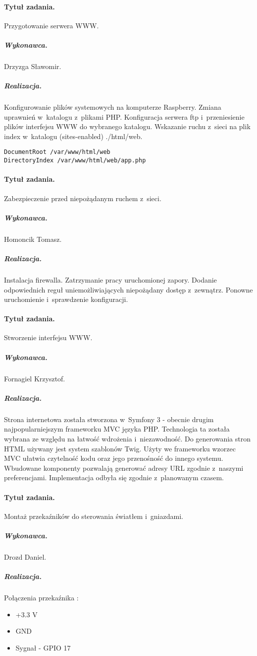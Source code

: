 \paragraph{Tytuł zadania.} Przygotowanie serwera WWW.
\subparagraph{Wykonawca.} Drzyzga Sławomir.
\subparagraph{Realizacja.} 
Konfigurowanie plików systemowych na komputerze Raspberry. Zmiana uprawnień w~katalogu z~plikami PHP. Konfiguracja serwera ftp i~przeniesienie plików interfejsu WWW do wybranego katalogu. Wskazanie ruchu z~sieci na plik index w~katalogu (sites-enabled) ./html/web.
\begin{verbatim}
DocumentRoot /var/www/html/web
DirectoryIndex /var/www/html/web/app.php
\end{verbatim}

	
	\paragraph{Tytuł zadania.} Zabezpieczenie przed niepożądanym ruchem z~sieci.
	\subparagraph{Wykonawca.} Homoncik Tomasz.
	\subparagraph{Realizacja.} Instalacja firewalla. Zatrzymanie pracy uruchomionej zapory. Dodanie odpowiednich reguł uniemożliwiających niepożądany dostęp z~zewnątrz. Ponowne uruchomienie i~sprawdzenie konfiguracji.
	
	\paragraph{Tytuł zadania.} Stworzenie interfejsu WWW.
	\subparagraph{Wykonawca.} Fornagiel Krzysztof.
	\subparagraph{Realizacja.} 
	Strona internetowa została stworzona w~Symfony 3 - obecnie drugim najpopularniejszym frameworku MVC języka PHP. Technologia ta została wybrana ze względu na łatwość wdrożenia i~niezawodność. Do generowania stron HTML używany jest system szablonów Twig. Użyty we frameworku wzorzec MVC ułatwia czytelność kodu oraz jego przenośność do innego systemu. Wbudowane komponenty pozwalają generować adresy URL zgodnie z~naszymi preferencjami. Implementacja odbyła się zgodnie z~planowanym czasem. 

	\paragraph{Tytuł zadania.} Montaż przekaźników do sterowania światłem i~gniazdami.
	\subparagraph{Wykonawca.} Drozd Daniel.
	\subparagraph{Realizacja.}   
	
 Połączenia przekaźnika : 
 \begin{itemize}
 	\item +3.3 V
 	\item GND
 	\item Sygnał - GPIO 17
 \end{itemize}
	
